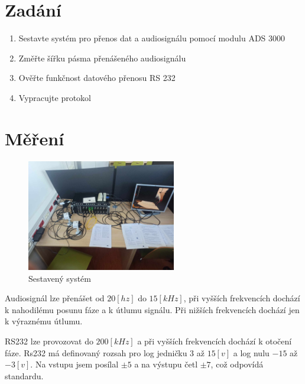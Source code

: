\section{Zadání}

\begin{enumerate}
    \item Sestavte systém pro přenos dat a audiosignálu pomocí modulu ADS 3000
    \item Změřte šířku pásma přenášeného audiosignálu
    \item Ověřte funkčnost datového přenosu RS 232
    \item Vypracujte protokol 
\end{enumerate}

\section{Měření}

\begin{figure}[h!]
    \centering
    \includegraphics[width=0.58\textwidth]{text/img/ADS3000.jpg} 
    \caption{\label{fig:ADS} Sestavený systém}
\end{figure}

Audiosignál lze přenášet od \(20 [hz]\) do \(15 [kHz]\), při vyšších frekvencích dochází k nahodilému posunu fáze a k útlumu signálu.
Při nižších frekvencích dochází jen k výraznému útlumu.

RS232 lze provozovat do \(200 [kHz]\) a při vyšších frekvencích dochází k otočení fáze.
Rs232 má definovaný rozsah pro log jedničku \(3\) až \(15 [v]\) a log nulu \(-15\) až \(-3 [v]\). 
Na vstupu jsem posílal \(\pm 5\) a na výstupu četl \(\pm7\), což odpovídá standardu.


